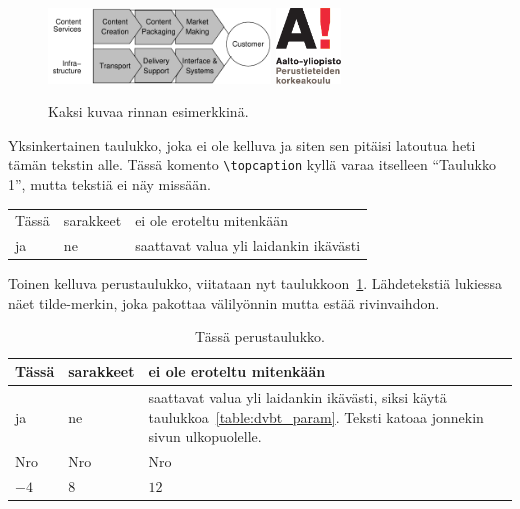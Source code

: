 \begin{figure}[htb]
  \begin{center}
    \includegraphics[height=20mm]{indica_model}
    \hspace{10mm}  %
    \includegraphics[height=20mm]{AaltoSCI_FI_1}
    \caption{Kaksi kuvaa rinnan esimerkkinä.}
    \label{fig:tuplat}
  \end{center}
\end{figure}

Yksinkertainen taulukko, joka ei ole kelluva ja siten sen pitäisi
latoutua heti tämän tekstin alle. Tässä komento \verb!\topcaption!
kyllä varaa itselleen ``Taulukko 1'', mutta tekstiä ei näy missään.

\begin{tabular}{|l|l|l|} 
\hline
Tässä & sarakkeet & ei ole eroteltu mitenkään \\
ja    & ne        & saattavat valua yli laidankin ikävästi \\
\hline
\end{tabular}

Toinen kelluva perustaulukko, viitataan nyt taulukkoon~\ref{table:perustaulu}.
Lähdetekstiä lukiessa näet tilde-merkin, joka pakottaa välilyönnin
mutta estää rivinvaihdon.

\begin{table}[ht]
\caption{Tässä perustaulukko.}
\label{table:perustaulu}
\begin{center}
\begin{tabular}{|l|l|l|} 
\hline
Tässä & sarakkeet & ei ole eroteltu mitenkään \\
\hline
ja    & ne        & saattavat valua yli laidankin ikävästi, %
                   siksi käytä taulukkoa~\ref{table:dvbt_param}. %
                   Teksti katoaa jonnekin sivun ulkopuolelle. \\
\hline
Nro   & Nro       & Nro \\
\hline
$-4$  & $8$       & $12$ \\
\hline
\end{tabular}
\end{center}
\end{table}

